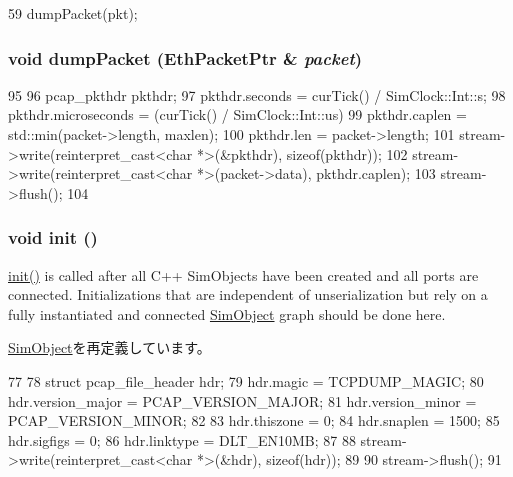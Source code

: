 \begin{DoxyCode}
59 { dumpPacket(pkt); }
\end{DoxyCode}
\hypertarget{classEtherDump_a38068da876076f5fe0bdfd8f9b2a5290}{
\subsubsection[{dumpPacket}]{\setlength{\rightskip}{0pt plus 5cm}void dumpPacket ({\bf EthPacketPtr} \& {\em packet})}}
\label{classEtherDump_a38068da876076f5fe0bdfd8f9b2a5290}



\begin{DoxyCode}
95 {
96     pcap_pkthdr pkthdr;
97     pkthdr.seconds = curTick() / SimClock::Int::s;
98     pkthdr.microseconds = (curTick() / SimClock::Int::us) %
99     pkthdr.caplen = std::min(packet->length, maxlen);
100     pkthdr.len = packet->length;
101     stream->write(reinterpret_cast<char *>(&pkthdr), sizeof(pkthdr));
102     stream->write(reinterpret_cast<char *>(packet->data), pkthdr.caplen);
103     stream->flush();
104 }
\end{DoxyCode}
\hypertarget{classEtherDump_a02fd73d861ef2e4aabb38c0c9ff82947}{
\subsubsection[{init}]{\setlength{\rightskip}{0pt plus 5cm}void init ()}}
\label{classEtherDump_a02fd73d861ef2e4aabb38c0c9ff82947}
\hyperlink{classEtherDump_a02fd73d861ef2e4aabb38c0c9ff82947}{init()} is called after all C++ SimObjects have been created and all ports are connected. Initializations that are independent of unserialization but rely on a fully instantiated and connected \hyperlink{classSimObject}{SimObject} graph should be done here. 

\hyperlink{classSimObject_a02fd73d861ef2e4aabb38c0c9ff82947}{SimObject}を再定義しています。


\begin{DoxyCode}
77 {
78     struct pcap_file_header hdr;
79     hdr.magic = TCPDUMP_MAGIC;
80     hdr.version_major = PCAP_VERSION_MAJOR;
81     hdr.version_minor = PCAP_VERSION_MINOR;
82 
83     hdr.thiszone = 0;
84     hdr.snaplen = 1500;
85     hdr.sigfigs = 0;
86     hdr.linktype = DLT_EN10MB;
87 
88     stream->write(reinterpret_cast<char *>(&hdr), sizeof(hdr));
89 
90     stream->flush();
91 }
\end{DoxyCode}


